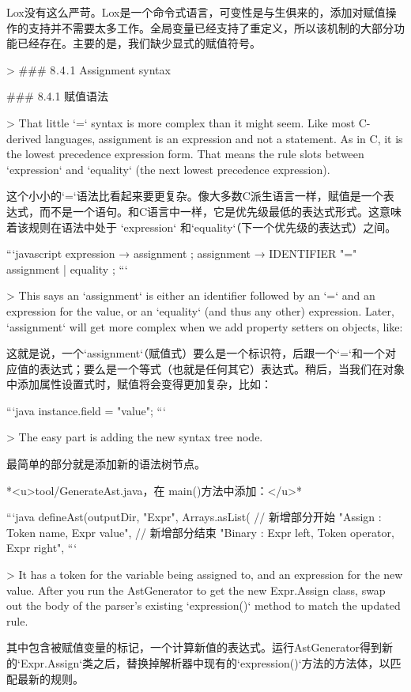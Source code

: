 \documentclass[cn,11pt,chinese]{elegantbook}
\begin{document}
{{{{{{{Lox没有这么严苛。Lox是一个命令式语言，可变性是与生俱来的，添加对赋值操作的支持并不需要太多工作。全局变量已经支持了重定义，所以该机制的大部分功能已经存在。主要的是，我们缺少显式的赋值符号。

> ### 8 . 4 . 1 Assignment syntax

### 8.4.1 赋值语法

> That little `=` syntax is more complex than it might seem. Like most C-derived languages, assignment is an expression and not a statement. As in C, it is the lowest precedence expression form. That means the rule slots between `expression` and `equality` (the next lowest precedence expression).

这个小小的`=`语法比看起来要更复杂。像大多数C派生语言一样，赋值是一个表达式，而不是一个语句。和C语言中一样，它是优先级最低的表达式形式。这意味着该规则在语法中处于 `expression` 和`equality`（下一个优先级的表达式）之间。

```javascript
expression     → assignment ;
assignment     → IDENTIFIER "=" assignment
               | equality ;
```

> This says an `assignment` is either an identifier followed by an `=` and an expression for the value, or an `equality` (and thus any other) expression. Later, `assignment` will get more complex when we add property setters on objects, like:

这就是说，一个`assignment`（赋值式）要么是一个标识符，后跟一个`=`和一个对应值的表达式；要么是一个等式（也就是任何其它）表达式。稍后，当我们在对象中添加属性设置式时，赋值将会变得更加复杂，比如：

```java
instance.field = "value";
```

> The easy part is adding the new syntax tree node.

最简单的部分就是添加新的语法树节点。

*<u>tool/GenerateAst.java，在 main()方法中添加：</u>*

```java
    defineAst(outputDir, "Expr", Arrays.asList(
      // 新增部分开始
      "Assign   : Token name, Expr value",
      // 新增部分结束
      "Binary   : Expr left, Token operator, Expr right",
```

> It has a token for the variable being assigned to, and an expression for the new value. After you run the AstGenerator to get the new Expr.Assign class, swap out the body of the parser’s existing `expression()` method to match the updated rule.

其中包含被赋值变量的标记，一个计算新值的表达式。运行AstGenerator得到新的`Expr.Assign`类之后，替换掉解析器中现有的`expression()`方法的方法体，以匹配最新的规则。

}}}}}}}
\end{document}
